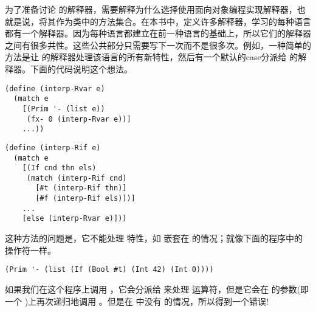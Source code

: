 \documentclass[11pt]{book}
\begin{document}
为了准备讨论 \LangVar{} 的解释器，需要解释为什么选择使用面向对象编程实现解释器，也就是说，将其作为类中的方法集合。在本书中，定义许多解释器，学习的每种语言都有一个解释器。因为每种语言都建立在前一种语言的基础上，所以它们的解释器之间有很多共性。这些公共部分只需要写下一次而不是很多次。例如，一种简单的方法是让 \LangIf{} 的解释器处理该语言的所有新特性，然后有一个默认的case分派给 \LangVar{} 的解释器。下面的代码说明这个想法。
\begin{center}
  \begin{minipage}{0.45\textwidth}
\begin{lstlisting}
(define (interp-Rvar e)
  (match e
    [(Prim '- (list e))
     (fx- 0 (interp-Rvar e))]
    ...))
\end{lstlisting}
\end{minipage}
\begin{minipage}{0.45\textwidth}
  \begin{lstlisting}
(define (interp-Rif e)
  (match e
    [(If cnd thn els)
     (match (interp-Rif cnd)
       [#t (interp-Rif thn)]
       [#f (interp-Rif els)])]
    ...
    [else (interp-Rvar e)]))    
\end{lstlisting}
\end{minipage}
\end{center}
这种方法的问题是，它不能处理 \LangIf{} 特性，如  嵌套在 \LangVar{} 的情况；就像下面的程序中的 \code{-} 操作符一样。
\begin{lstlisting}
(Prim '- (list (If (Bool #t) (Int 42) (Int 0))))
\end{lstlisting}
如果我们在这个程序上调用  ，它会分派给 来处理 \code{-} 运算符，但是它会在 \code{-}
的参数(即一个  )上再次递归地调用  。但是在  中没有  的情况，所以得到一个错误!
\end{document}
